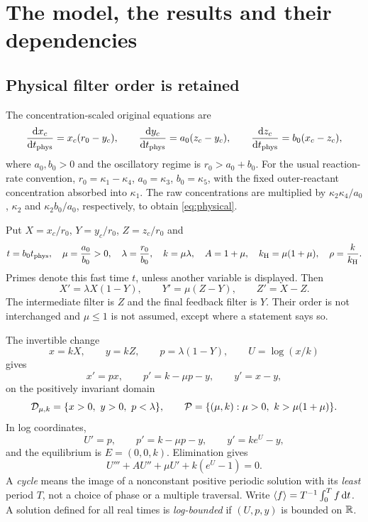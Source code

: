 \section{The model, the results and their dependencies}\label{sec:model}
\subsection{Physical filter order is retained}
The concentration-scaled original equations are
\begin{equation}\label{eq:physical}
\frac{\mathrm dx_c}{\mathrm dt_{\rm phys}}=x_c(r_0-y_c),\qquad
\frac{\mathrm dy_c}{\mathrm dt_{\rm phys}}=a_0(z_c-y_c),\qquad
\frac{\mathrm dz_c}{\mathrm dt_{\rm phys}}=b_0(x_c-z_c),
\end{equation}
where $a_0,b_0>0$ and the oscillatory regime is $r_0>a_0+b_0$.
For the usual reaction-rate convention, $r_0=\kappa_1-\kappa_4$, $a_0=\kappa_3$, $b_0=\kappa_5$, with the fixed outer-reactant concentration absorbed into $\kappa_1$. The raw concentrations are multiplied by $\kappa_2\kappa_4/a_0$, $\kappa_2$ and $\kappa_2b_0/a_0$, respectively, to obtain \eqref{eq:physical}.

Put $X=x_c/r_0$, $Y=y_c/r_0$, $Z=z_c/r_0$ and
\begin{equation}\label{eq:parameters}
t=b_0t_{\rm phys},\quad \mu=\frac{a_0}{b_0}>0,\quad
\lambda=\frac{r_0}{b_0},\quad k=\mu\lambda,\quad A=1+\mu,\quad k_{\mathrm H}=\mu(1+\mu),\quad \rho=\frac{k}{k_{\mathrm H}}.
\end{equation}
Primes denote this fast time $t$, unless another variable is displayed. Then
\begin{equation}\label{eq:filters}
X'=\lambda X(1-Y),\qquad Y'=\mu(Z-Y),\qquad Z'=X-Z.
\end{equation}
The intermediate filter is $Z$ and the final feedback filter is $Y$. Their order is not interchanged and $\mu\le1$ is not assumed, except where a statement says so.

The invertible change
\begin{equation}\label{eq:change}
x=kX,\qquad y=kZ,\qquad p=\lambda(1-Y),\qquad U=\log(x/k)
\end{equation}
gives
\begin{equation}\label{eq:system}
x'=px,\qquad p'=k-\mu p-y,\qquad y'=x-y,
\end{equation}
on the positively invariant domain
\[
\mathcal D_{\mu,k}=\{x>0,\ y>0,\ p<\lambda\},\qquad
\mathcal P=\{(\mu,k):\mu>0,\ k>\mu(1+\mu)\}.
\]
In log coordinates,
\begin{equation}\label{eq:logsystem}
U'=p,\qquad p'=k-\mu p-y,\qquad y'=ke^U-y,
\end{equation}
and the equilibrium is $E=(0,0,k)$. Elimination gives
\begin{equation}\label{eq:scalar}
U'''+AU''+\mu U'+k(e^U-1)=0.
\end{equation}
A \emph{cycle} means the image of a nonconstant positive periodic solution with its \emph{least} period $T$, not a choice of phase or a multiple traversal. Write $\left\langle f\right\rangle=T^{-1}\int_0^T f\,\mathrm dt$. A solution defined for all real times is \emph{log-bounded} if $(U,p,y)$ is bounded on $\mathbb R$.

